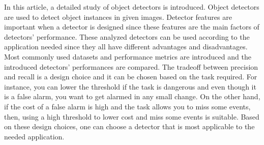 \documentclass{article}
\begin{document}
\setlength{\parindent}{6ex}

\indent

In this article, a detailed study of object detectors is introduced. Object detectors 
are used to detect object instances in given images. Detector features are important when 
a detector is designed since these features are the main factors of detectors' performance. 
These analyzed detectors can be used according to the application needed since they all have different 
advantages and disadvantages. Most commonly used datasets and performance metrics are introduced 
and the introduced detectors' performances are compared. The tradeoff between precision and 
recall is a design choice and it can be chosen based on the task required. For instance, you can lower the 
threshold if the task is dangerous and even though it is a false alarm, you want to get alarmed in any small 
change. On the other hand, if the cost of a false alarm is high and the task allows you to miss some events, 
then, using a high threshold to lower cost and miss some events is suitable. Based on these design choices, one 
can choose a detector that is most applicable to the needed application.
\end{document}
